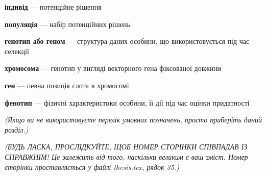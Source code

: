 
\textbf{індивід} --- потенційне рішення

\textbf{популяція} --- набір потенційних рішень

\textbf{генотип або геном} --- структура даних особини, що використовується під час селекції 

\textbf{хромосома} --- генотип у вигляді векторного гена фіксованої довжини 

\textbf{ген} --- певна позиція слота в хромосомі 

\textbf{фенотип} --- фізичні характеристики особини, її дії під час оцінки придатності 



\textit{
(Якщо ви не використовуєте перелік умовних позначень, просто приберіть 
даний розділ.)}

\textit{(БУДЬ ЛАСКА, ПРОСЛІДКУЙТЕ, ЩОБ НОМЕР СТОРІНКИ СПІВПАДАВ ІЗ СПРАВЖНІМ! Це залежить від того, наскільки великим є ваш зміст.
Номер сторінки проставляється у файлі thesis.tex, рядок 35.)
}
